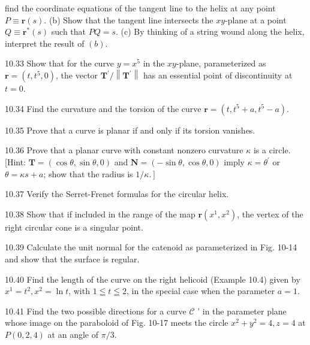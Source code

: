 \documentclass[10pt]{article}
\begin{document}
find the coordinate equations of the tangent line to the helix at any point $P \equiv \mathbf{r}(s)$. (b) Show that the tangent line intersects the $x y$-plane at a point $Q \equiv \mathbf{r}^{*}(s)$ such that $P Q=s$. (c) By thinking of a string wound along the helix, interpret the result of $(b)$.

10.33 Show that for the curve $y=x^{5}$ in the $x y$-plane, parameterized as $\mathbf{r}=\left(t, t^{5}, 0\right)$, the vector $\mathbf{T}^{\prime} /\left\|\mathbf{T}^{\prime}\right\|$ has an essential point of discontinuity at $t=0$.

10.34 Find the curvature and the torsion of the curve $\mathbf{r}=\left(t, t^{5}+a, t^{5}-a\right)$.

10.35 Prove that a curve is planar if and only if its torsion vanishes.

10.36 Prove that a planar curve with constant nonzero curvature $\kappa$ is a circle. [Hint: $\mathbf{T}=(\cos \theta, \sin \theta, 0)$ and $\mathbf{N}=(-\sin \theta, \cos \theta, 0)$ imply $\kappa=\theta^{\prime}$ or $\theta=\kappa s+a$; show that the radius is $\left.1 / \kappa.\right]$

10.37 Verify the Serret-Frenet formulas for the circular helix.

10.38 Show that if included in the range of the map $\mathbf{r}\left(x^{1}, x^{2}\right)$, the vertex of the right circular cone is a singular point.

10.39 Calculate the unit normal for the catenoid as parameterized in Fig. 10-14 and show that the surface is regular.

10.40 Find the length of the curve on the right helicoid (Example 10.4) given by $x^{1}=t^{2}, x^{2}=\ln t$, with $1 \leqq t \leqq 2$, in the special case when the parameter $a=1$.

10.41 Find the two possible directions for a curve $\mathscr{C}$ ' in the parameter plane whose image on the paraboloid of Fig. 10-17 meets the circle $x^{2}+y^{2}=4, z=4$ at $P(0,2,4)$ at an angle of $\pi / 3$.
\end{document}
